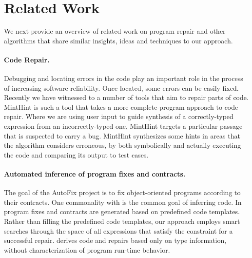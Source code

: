 \section{Related Work}
\label{sec:related}

We next provide an overview of related work on program repair and other algorithms
that share similar insights, ideas and techniques to our approach.

\paragraph{{\bf Code Repair.}} 
Debugging and locating errors in the code \cite{Pavlinovic:2014, Chandra:2011:AD} play 
an important role in the process of increasing software reliability. Once located, 
some errors can be easily fixed. Recently we have witnessed to a number of tools that 
aim to repair parts of code. MintHint \citep{MintHint} is such a tool that takes a more complete-program approach to code repair. Where we are using user input to guide synthesis of a correctly-typed expression from an incorrectly-typed one, MintHint targets a particular passage that is suspected to carry a bug. MintHint synthesizes some hints in areas that the algorithm considers erroneous, by both symbolically and actually executing the code and comparing its output to test cases.

\paragraph{{\bf Automated inference of program fixes and contracts.}}
The goal of the AutoFix project \cite{WeiETAL11InferringBetterContracts,PeiETAL11CodebasedAutomatedProgramFixing} is to fix
 object-oriented programs according to their
contracts. One commonality with \ourTool is the common goal of inferring code. 
In \cite{WeiETAL11InferringBetterContracts,PeiETAL11CodebasedAutomatedProgramFixing} program fixes and contracts are generated based on predefined code templates. Rather than filling 
the predefined code templates,
our approach employs smart searches through the space of all expressions that
satisfy the constraint for a successful repair.
\ourTool derives code and repairs based only on type information, without characterization of program run-time
behavior.

